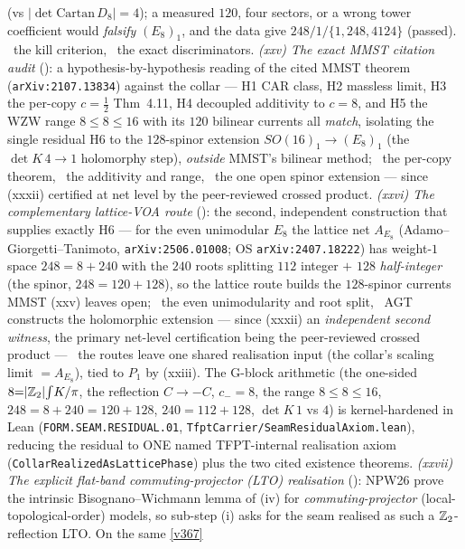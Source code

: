 (vs $|\!\det\mathrm{Cartan}\,D_8|{=}4$); a measured $120$, four sectors, or a wrong tower coefficient would
\emph{falsify} $(E_8)_1$, and the data give $248/1/\{1,248,4124\}$ (passed). \mX\ the kill criterion, \mE\ the exact
discriminators. \emph{(xxv) The exact MMST citation audit} (): a
hypothesis-by-hypothesis reading of the cited MMST theorem (\texttt{arXiv:2107.13834}) against the collar --- H1 CAR
class, H2 massless limit, H3 the per-copy $c{=}\tfrac12$ Thm~4.11, H4 decoupled additivity to $c{=}8$, and H5 the WZW
range $8{\le}8{\le}16$ with its $120$ bilinear currents all \emph{match}, isolating the single residual H6 to the
$128$-spinor extension $SO(16)_1{\to}(E_8)_1$ (the $\det K\,4{\to}1$ holomorphy step), \emph{outside} MMST's bilinear
method; \mE\ the per-copy theorem, \mC\ the additivity and range, \mO\ the one open spinor extension --- since
(xxxii) certified at net level by the peer-reviewed crossed product. \emph{(xxvi)
The complementary lattice-VOA route} (): the second, independent
construction that supplies exactly H6 --- for the even unimodular $E_8$ the lattice net $A_{E_8}$
(Adamo--Giorgetti--Tanimoto, \texttt{arXiv:2506.01008}; OS \texttt{arXiv:2407.18222}) has weight-$1$ space
$248{=}8{+}240$ with the $240$ roots splitting $112$ integer $+$ $128$ \emph{half-integer} (the spinor,
$248{=}120{+}128$), so the lattice route builds the $128$-spinor currents MMST (xxv) leaves open; \mE\ the even
unimodularity and root split, \mC\ AGT constructs the holomorphic extension --- since (xxxii) an \emph{independent
second witness}, the primary net-level certification being the peer-reviewed crossed product --- \mO\ the routes
leave one shared realisation input (the collar's scaling limit $={}A_{E_8}$), tied to $P_1$ by (xxiii). The G-block arithmetic
(the one-sided $8{=}|\mathbb Z_2|\!\int\!K/\pi$, the reflection $C{\to}{-}C$, $c_-{=}8$, the range $8{\le}8{\le}16$,
$248{=}8{+}240{=}120{+}128$, $240{=}112{+}128$, $\det K\,1$ vs $4$) is kernel-hardened in Lean
(\texttt{FORM.SEAM.RESIDUAL.01}, \texttt{TfptCarrier/SeamResidualAxiom.lean}), reducing the residual to ONE named
TFPT-internal realisation axiom (\texttt{CollarRealizedAsLatticePhase}) plus the two cited existence theorems.
\emph{(xxvii) The explicit flat-band commuting-projector (LTO) realisation} (): NPW26
prove the intrinsic Bisognano--Wichmann lemma of (iv) for \emph{commuting-projector} (local-topological-order)
models, so sub-step (i) asks for the seam realised as such a $\mathbb Z_2$-reflection LTO. On the same \vref{v367}

